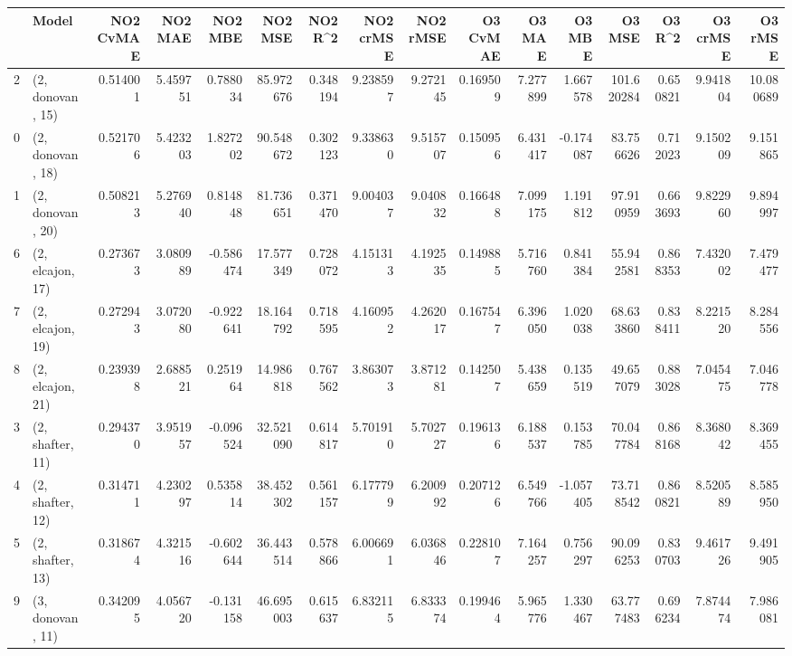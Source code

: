 \begin{tabular}{llrrrrrrrrrrrrrr}
\toprule
{} &             Model &  NO2 CvMAE &   NO2 MAE &   NO2 MBE &    NO2 MSE &   NO2 R\textasciicircum2 &  NO2 crMSE &  NO2 rMSE &  O3 CvMAE &    O3 MAE &    O3 MBE &      O3 MSE &    O3 R\textasciicircum2 &   O3 crMSE &    O3 rMSE \\
\midrule
2  &  (2, donovan, 15) &   0.514001 &  5.459751 &  0.788034 &  85.972676 &  0.348194 &   9.238597 &  9.272145 &  0.169509 &  7.277899 &  1.667578 &  101.620284 &  0.650821 &   9.941804 &  10.080689 \\
0  &  (2, donovan, 18) &   0.521706 &  5.423203 &  1.827202 &  90.548672 &  0.302123 &   9.338630 &  9.515707 &  0.150956 &  6.431417 & -0.174087 &   83.756626 &  0.712023 &   9.150209 &   9.151865 \\
1  &  (2, donovan, 20) &   0.508213 &  5.276940 &  0.814848 &  81.736651 &  0.371470 &   9.004037 &  9.040832 &  0.166488 &  7.099175 &  1.191812 &   97.910959 &  0.663693 &   9.822960 &   9.894997 \\
6  &  (2, elcajon, 17) &   0.273673 &  3.080989 & -0.586474 &  17.577349 &  0.728072 &   4.151313 &  4.192535 &  0.149885 &  5.716760 &  0.841384 &   55.942581 &  0.868353 &   7.432002 &   7.479477 \\
7  &  (2, elcajon, 19) &   0.272943 &  3.072080 & -0.922641 &  18.164792 &  0.718595 &   4.160952 &  4.262017 &  0.167547 &  6.396050 &  1.020038 &   68.633860 &  0.838411 &   8.221520 &   8.284556 \\
8  &  (2, elcajon, 21) &   0.239398 &  2.688521 &  0.251964 &  14.986818 &  0.767562 &   3.863073 &  3.871281 &  0.142507 &  5.438659 &  0.135519 &   49.657079 &  0.883028 &   7.045475 &   7.046778 \\
3  &  (2, shafter, 11) &   0.294370 &  3.951957 & -0.096524 &  32.521090 &  0.614817 &   5.701910 &  5.702727 &  0.196136 &  6.188537 &  0.153785 &   70.047784 &  0.868168 &   8.368042 &   8.369455 \\
4  &  (2, shafter, 12) &   0.314711 &  4.230297 &  0.535814 &  38.452302 &  0.561157 &   6.177799 &  6.200992 &  0.207126 &  6.549766 & -1.057405 &   73.718542 &  0.860821 &   8.520589 &   8.585950 \\
5  &  (2, shafter, 13) &   0.318674 &  4.321516 & -0.602644 &  36.443514 &  0.578866 &   6.006691 &  6.036846 &  0.228107 &  7.164257 &  0.756297 &   90.096253 &  0.830703 &   9.461726 &   9.491905 \\
9  &  (3, donovan, 11) &   0.342095 &  4.056720 & -0.131158 &  46.695003 &  0.615637 &   6.832115 &  6.833374 &  0.199464 &  5.965776 &  1.330467 &   63.777483 &  0.696234 &   7.874474 &   7.986081 \\

\end{tabular}
